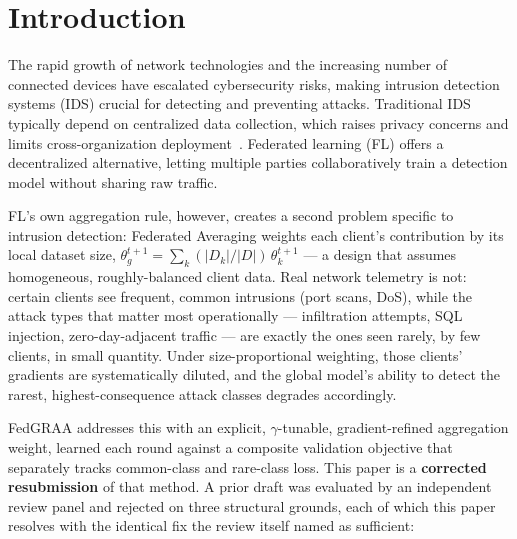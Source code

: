 \documentclass{llncs}
\begin{document}
\begin{abstract}
up-weighted to \textbf{2.0--3.1$\times$ its uniform share} by construction, and we report this finding, two external defenses' honest (and, in one case, weak) performance against it, and the further finding that successful defense itself costs FedGRAA-v2 its rare-class advantage --- rather than eliding any of it.

\end{abstract}

\section{Introduction}

The rapid growth of network technologies and the increasing number of connected devices have escalated cybersecurity risks, making intrusion detection systems (IDS) crucial for detecting and preventing attacks. Traditional IDS typically depend on centralized data collection, which raises privacy concerns and limits cross-organization deployment~\cite{FedAvg}. Federated learning (FL) offers a decentralized alternative, letting multiple parties collaboratively train a detection model without sharing raw traffic.

FL's own aggregation rule, however, creates a second problem specific to intrusion detection: Federated Averaging weights each client's contribution by its local dataset size, $\theta_g^{t+1} = \sum_k (|D_k|/|D|)\, \theta_k^{t+1}$ --- a design that assumes homogeneous, roughly-balanced client data. Real network telemetry is not: certain clients see frequent, common intrusions (port scans, DoS), while the attack types that matter most operationally --- infiltration attempts, SQL injection, zero-day-adjacent traffic --- are exactly the ones seen rarely, by few clients, in small quantity. Under size-proportional weighting, those clients' gradients are systematically diluted, and the global model's ability to detect the rarest, highest-consequence attack classes degrades accordingly.

FedGRAA addresses this with an explicit, $\gamma$-tunable, gradient-refined aggregation weight, learned each round against a composite validation objective that separately tracks common-class and rare-class loss. This paper is a \textbf{corrected resubmission} of that method. A prior draft was evaluated by an independent review panel and rejected on three structural grounds, each of which this paper resolves with the identical fix the review itself named as sufficient:
\end{document}
